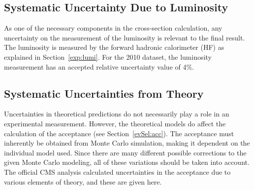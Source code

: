 \subsection{Systematic Uncertainty Due to Luminosity}
\label{anMeth:SystsLumi}


As one of the necessary components in the 
cross-section calculation, 
any uncertainty on the measurement of the luminosity 
is relevant to the final result.  
The luminosity is measured by the forward hadronic calorimeter (HF) 
as explained in Section~\ref{exp:lumi}.  
For the 2010 dataset, 
the luminosity measurement has an accepted 
relative uncertainty value of 4\%.  %

\subsection{Systematic Uncertainties from Theory}
\label{anMeth:SystsTheory}



Uncertainties in theoretical predictions do not 
necessarily play a role in an experimental measurement.  
However, the theoretical models do affect the 
calculation of the acceptance (see Section~\ref{evSel:acc}).  
The acceptance must inherently be obtained from 
Monte Carlo simulation, making it dependent on the 
individual model used.  
Since there are many different possible corrections 
to the given Monte Carlo modeling, 
all of these variations should be taken into account.  
The official CMS \Zee analysis calculated %
uncertainties in the acceptance due to 
various elements of theory, 
and these are given here.  




